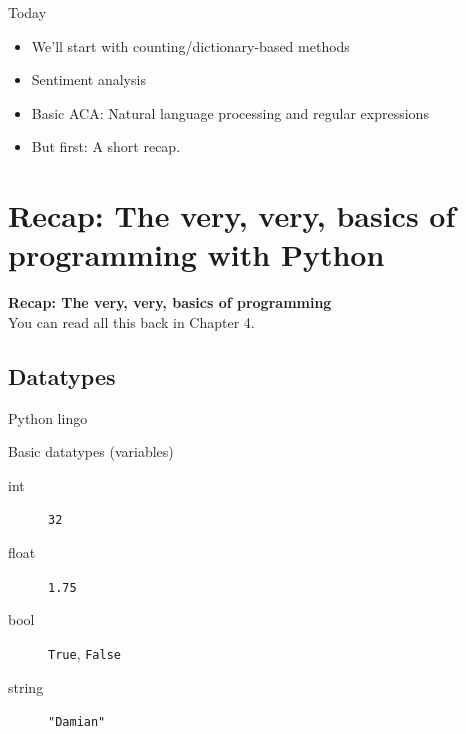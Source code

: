 \documentclass{beamer}
\begin{document}
\begin{frame}{Today}
	\begin{itemize}
		\item We'll start with counting/dictionary-based methods
		\item Sentiment analysis
		\item Basic ACA: Natural language processing and regular expressions
		\item<+> But first: A short recap.
	\end{itemize}
	
\end{frame}



\section[Basics]{Recap: The very, very, basics of programming with Python}
\begin{frame}[plain]
\textbf{Recap: The very, very, basics of programming}\\
\vspace{1cm}
You can read all this back in Chapter 4.
\end{frame}
\subsection{Datatypes}


\begin{frame}{Python lingo}
\begin{block}{Basic datatypes (variables)}
\begin{description}
\item[{\color{red}int}] \texttt{32}
\item[{\color{red}float}] \texttt{1.75}
\item[{\color{red}bool}] \texttt{True}, \texttt{False}
\item[{\color{red}string}] \texttt{"Damian"}
\end{description}
\end{block}
\\
\end{frame}
\end{document}
